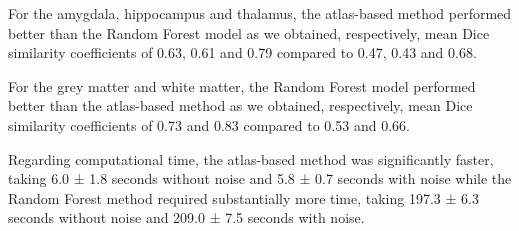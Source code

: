 For the amygdala, hippocampus and thalamus, the atlas-based method performed better than the Random Forest model as we obtained, respectively, mean Dice similarity coefficients of 0.63, 0.61 and 0.79 compared to 0.47, 0.43 and 0.68.

For the grey matter and white matter, the Random Forest model performed better than the atlas-based method as we obtained, respectively, mean Dice similarity coefficients of 0.73 and 0.83 compared to 0.53 and 0.66.


Regarding computational time, the atlas-based method was significantly faster, taking 6.0 ± 1.8 seconds without noise and 5.8 ± 0.7 seconds with noise while the Random Forest method required substantially more time, taking 197.3 ± 6.3 seconds without noise and 209.0 ± 7.5 seconds with noise.

\begin{comment}
The comparison of segmentation performance between the Random Forest-based and Atlas-based methods, both with and without noise, revealed distinct trends across brain regions. These differences can be seen in Table \RNum{1}. 

For the amygdala, the Atlas-based method without noise achieved the highest Dice score (0.63 ± 0.08) compared to the Random Forest method (0.47 ± 0.06). With noise, the Atlas-based method scored slightly lower (0.61 ± 0.07) but still outperformed the Random Forest method (0.47 ± 0.06). 

For the hippocampus, the Atlas-based method performed better in noisy conditions, achieving the highest Dice score (0.63 ± 0.06) compared to the performance without noise (0.61 ± 0.10), while the Random Forest method showed no variability, scoring consistently (0.43 ± 0.05).

For the thalamus, the Atlas-based method achieved the best performance without noise (0.79 ± 0.04), slightly decreasing in the presence of noise (0.78 ± 0.05), whereas the Random Forest method showed consistent performance (0.68 ± 0.10) across conditions. 

For grey matter, the Random Forest method performed better with noise (0.74 ± 0.01) than without noise (0.73 ± 0.01), while the Atlas-based method performed significantly worse, scoring 0.53 ± 0.02 without noise and 0.52 ± 0.03 with noise. For white matter, the Random Forest method outperformed the Atlas-based method with a consistent Dice score of 0.83 ± 0.02 across noise conditions, whereas the Atlas-based method achieved 0.66 ± 0.03 in both cases.

Regarding computational time, the Atlas-based method was significantly faster, taking 6.0 ± 1.8 seconds without noise and 5.8 ± 0.7 seconds with noise. In contrast, the Random Forest method required substantially more time, taking 197.3 ± 6.3 seconds without noise and 209.0 ± 7.5 seconds with noise. These results demonstrate clear differences in segmentation performance and computational efficiency between the two methods.
\end{comment}